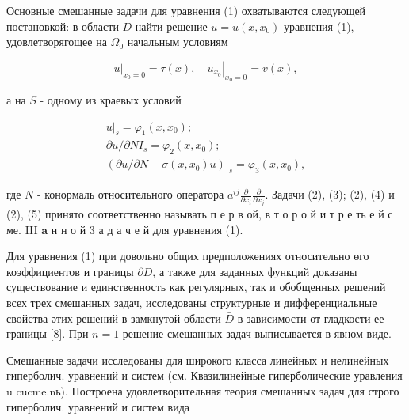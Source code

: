\documentclass[10pt]{article}
\begin{document}
Основные смешанные задачи для уравнения (1) охватываются следующей постановкой: в области $D$ найти решение $u=u\left(x, x_{0}\right)$ уравнения (1), удовлетворягощее на $\Omega_{0}$ начальным условиям



\[

\left.u\right|_{x_{0}=0}=\tau(x),\left.\quad u_{x_{0}}\right|_{x_{0}=0}=v(x),

\]



а на $S$ - одному из краевых условий



\[

\begin{gathered}

\left.u\right|_{s}=\varphi_{1}\left(x, x_{0}\right) ; \\

\partial u / \partial N I_{s}=\varphi_{2}\left(x, x_{0}\right) ; \\

\left.\left(\partial u / \partial N+\sigma\left(x, x_{0}\right) u\right)\right|_{s}=\varphi_{3}\left(x, x_{0}\right),

\end{gathered}

\]



где $N$ - конормаль относительного оператора $a^{i j} \frac{\partial}{\partial x_{i}} \frac{\partial}{\partial x_{j}}$. Задачи (2), (3); (2), (4) и (2), (5) принято соответственно называть п е р в ой, в т о р о й и т р е ть е й с ме. III $\mathbf{a}$ н н о й 3 а д а ч е й для уравнения (1).



Для уравнения (1) при довольно общих предположениях относительно өго коэффициентов и границы $\partial D$, а также для заданных функций доказаны существование и единственность как регулярных, так и обобщенных решений всех трех смешанных задач, исследованы структурные и дифференциальные свойства әтих решений в замкнутой области $\bar{D}$ в зависимости от гладкости ее границы [8]. При $n=1$ решение смешанных задач выписывается в явном виде.



Смешанные задачи исследованы для широкого класса линейных и нелинейных гиперболич. уравнений и систем (см. Квазилинейные гиперболические уравления u cucme.nь). Построена удовлетворительная теория смешанных задач для строго гиперболич. уравнений и систем вида
\end{document}
